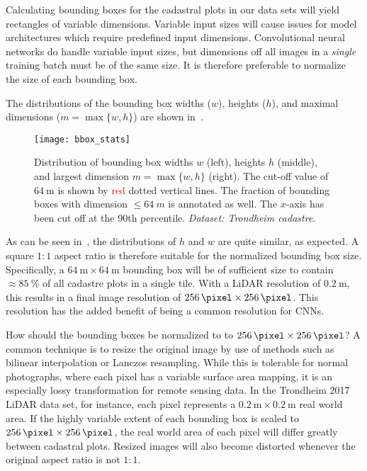 Calculating bounding boxes for the cadastral plots in our data sets will yield rectangles of variable dimensions.
Variable input sizes will cause issues for model architectures which require predefined input dimensions.
Convolutional neural networks do handle variable input sizes, but dimensions off all images in a \textit{single} training batch must be of the same size.
It is therefore preferable to normalize the size of each bounding box.

The distributions of the bounding box widths ($w$), heights ($h$), and maximal dimensions ($m = \max \{w, h\}$) are shown in~.

\begin{figure}[htb]
  \texttt{[image: bbox\_stats]}
  \caption{%
    Distribution of bounding box widths $w$ (left), heights $h$ (middle), and largest dimension $m = \max \{w, h\}$ (right).
    The cut-off value of $\SI{64}{\meter}$ is shown by \textcolor{red}{red} dotted vertical lines.
    The fraction of bounding boxes with dimension $\leq \SI{64}{m}$ is annotated as well.
    The $x$-axis has been cut off at the 90th percentile.
    \textit{Dataset: Trondheim cadastre}.
  }%
  \label{fig:bbox-stats}
\end{figure}

As can be seen in~, the distributions of $h$ and $w$ are quite similar, as expected.
A square $1:1$ aspect ratio is therefore suitable for the normalized bounding box size.
Specifically, a $\SI{64}{\meter} \times \SI{64}{\meter}$ bounding box will be of sufficient size to contain $\approx \SI{85}{\percent}$ of all cadastre plots in a single tile.
With a LiDAR resolution of $\SI{0.2}{\meter}$, this results in a final image resolution of $\SI{256}{\pixel} \times \SI{256}{\pixel}$.
This resolution has the added benefit of being a common resolution for CNNs.

How should the bounding boxes be normalized to to $\SI{256}{\pixel} \times \SI{256}{\pixel}$?
A common technique is to resize the original image by use of methods such as bilinear interpolation or Lanczos resampling.
While this is tolerable for normal photographs, where each pixel has a variable surface area mapping, it is an especially lossy transformation for remote sensing data.
In the Trondheim 2017 LiDAR data set, for instance, each pixel represents a $\SI{0.2}{\meter} \times \SI{0.2}{\meter}$ real world area.
If the highly variable extent of each bounding box is scaled to $\SI{256}{\pixel} \times \SI{256}{\pixel}$, the real world area of each pixel will differ greatly between cadastral plots.
Resized images will also become distorted whenever the original aspect ratio is not $1:1$.

